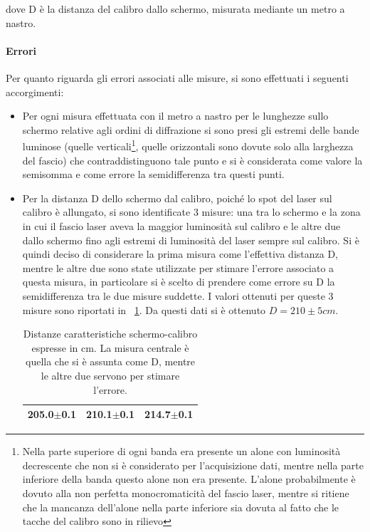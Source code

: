 \documentclass[a4paper,10pt]{article}
\begin{document}
{{dove D è la distanza del calibro dallo schermo, misurata mediante un metro a nastro.
\paragraph{Errori}
Per quanto riguarda gli errori associati alle misure, si sono effettuati i seguenti accorgimenti:
\begin{itemize}
\item Per ogni misura effettuata con il metro a nastro per le lunghezze sullo schermo relative agli ordini di diffrazione si sono presi gli estremi delle bande luminose (quelle verticali\footnote{Nella parte superiore di ogni banda era presente un alone con luminosità decrescente che non si è considerato per l'acquisizione dati, mentre nella parte inferiore della banda questo alone non era presente. L'alone probabilmente è dovuto alla non perfetta monocromaticità del fascio laser, mentre si ritiene che la mancanza dell'alone nella parte inferiore sia dovuta al fatto che le tacche del calibro sono in rilievo},
quelle orizzontali sono dovute solo alla larghezza del fascio) che contraddistinguono tale punto e si è considerata come valore la semisomma e come errore la semidifferenza tra questi punti.
\item Per la distanza D dello schermo dal calibro, poiché lo spot del laser sul calibro è allungato, si sono identificate 3 misure: una tra lo schermo e la zona in cui il fascio laser aveva la maggior luminosità sul calibro e le altre due dallo schermo fino agli estremi di luminosità del laser sempre sul calibro. Si è quindi deciso di considerare la prima misura come l'effettiva distanza D, mentre le altre due sono state utilizzate per stimare l'errore associato a questa misura, in particolare si è scelto di prendere come errore su D la semidifferenza tra le due misure suddette. I valori ottenuti per queste 3 misure sono riportati in \tablename{~\ref{tab:D}}. Da questi dati si è ottenuto $D = 210 \pm 5 cm$.

\begin{table}[H]
	\centering
	\begin{tabular}{c|c|c}
\hline
205.0$\pm$0.1 & 210.1$\pm$0.1 & 214.7$\pm$0.1\\
\hline
	\end{tabular}
\caption{Distanze caratteristiche schermo-calibro espresse in cm. La misura centrale è quella che si è assunta come D, mentre le altre due servono per stimare l'errore.}
\label{tab:D}
\end{table}


\end{itemize}}}
\end{document}
